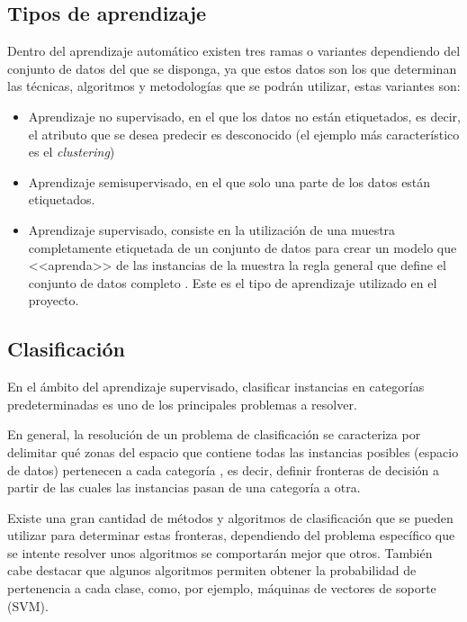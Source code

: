 \subsection{Tipos de aprendizaje}

Dentro del aprendizaje automático existen tres ramas o variantes dependiendo del
conjunto de datos del que se disponga, ya que estos datos son los que determinan
las técnicas, algoritmos y metodologías que se podrán utilizar, estas variantes
son:
\begin{itemize}
    \item Aprendizaje no supervisado, en el que los datos no están
    etiquetados, es decir, el atributo que se desea predecir es desconocido (el
    ejemplo más característico es el \textit{clustering})
    \item Aprendizaje semisupervisado, en el que solo una parte de los datos
    están etiquetados.
    \item Aprendizaje supervisado, consiste en la utilización de una muestra
    completamente etiquetada de un conjunto de datos para crear un modelo que
    <<aprenda>> de las instancias de la muestra la regla general que define el
    conjunto de datos completo \cite{learned2014introduction}. Este es el tipo
    de aprendizaje utilizado en el proyecto.
\end{itemize}

\subsection{Clasificación}

En el ámbito del aprendizaje supervisado, clasificar instancias en categorías
predeterminadas es uno de los principales problemas a resolver.

En general, la resolución de un problema de clasificación se caracteriza por
delimitar qué zonas del espacio que contiene todas las instancias posibles
(espacio de datos) pertenecen a cada categoría , es decir, definir fronteras de
decisión a partir de las cuales las instancias pasan de una categoría a otra.

Existe una gran cantidad de métodos y algoritmos de clasificación que se pueden
utilizar para determinar estas fronteras, dependiendo del problema específico
que se intente resolver unos algoritmos se comportarán mejor que otros. También
cabe destacar que algunos algoritmos permiten obtener la probabilidad de
pertenencia a cada clase, como, por ejemplo, máquinas de vectores de soporte
(SVM).


